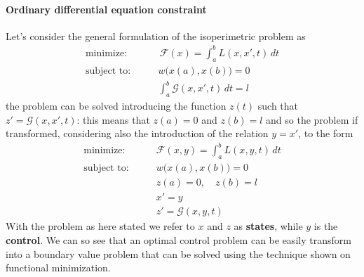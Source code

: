 \paragraph{Ordinary differential equation constraint} Let's consider the general formulation of the isoperimetric problem as
\begin{align*}
	\textrm{minimize:} \qquad & \, \mathcal F(x) = \int_a^b  L (x,x',t)\, dt \\
	\textrm{subject to:}\qquad & w\big(x(a),x(b) \big)= 0 \\
	& \int_a^b \mathcal G(x,x',t)\,dt = l
\end{align*}
the problem can be solved introducing the function $z(t)$ such that $z' = \mathcal G(x,x',t)$: this means that $z(a) = 0$ and $z(b) = l$ and so the problem if transformed, considering also the introduction of the relation $y = x'$, to the form
\begin{align*}
	\textrm{minimize:} \qquad & \mathcal F(x,y) = \int_a^b  L (x,y,t)\, dt \\
	\textrm{subject to:}\qquad & w\big(x(a),x(b) \big)= 0 \\
	& z(a) = 0,\quad z(b) = l \\ & x' = y \\ & z' = \mathcal G(x,y,t)
\end{align*}
With the problem as here stated we refer to $x$ and $z$ as \textbf{states}, while $y$ is the \textbf{control}. We can so see that an optimal control problem can be easily transform into a boundary value problem that can be solved using the technique shown on functional minimization.

